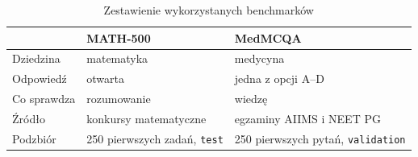 \begin{table}[H]
    \centering
    \caption{Zestawienie wykorzystanych benchmarków}
    \label{tab:zestawienie_benchmarkow}
    \begin{tabular}{|l|l|l|}
        \hline
        \rowcolor{gray!20}
        & \textbf{MATH-500} & \textbf{MedMCQA} \\ \hline
        Dziedzina & matematyka & medycyna \\ \hline
        Odpowiedź & otwarta & jedna z opcji A--D \\ \hline
        Co sprawdza & rozumowanie & wiedzę \\ \hline
        Źródło & konkursy matematyczne & egzaminy AIIMS i NEET PG \\ \hline
        Podzbiór & 250 pierwszych zadań, \texttt{test} & 250 pierwszych pytań, \texttt{validation} \\ \hline
    \end{tabular}
\end{table}